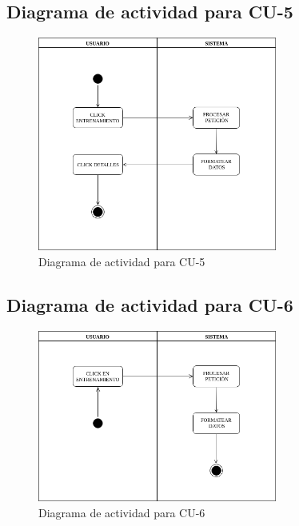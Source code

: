 \subsection{Diagrama de actividad para CU-5 }
\begin{figure}[H]
  \begin{center}
    \includegraphics[width=0.7\textwidth]{imagenes/DA-CU-5.png}
    \caption{Diagrama de actividad para CU-5}
    \label{fig:DA-CU-5}
  \end{center}
\end{figure}
\subsection{Diagrama de actividad para CU-6 }
\begin{figure}[H]
  \begin{center}
    \includegraphics[width=0.7\textwidth]{imagenes/DA-CU-6.png}
    \caption{Diagrama de actividad para CU-6}
    \label{fig:DA-CU-6}
  \end{center}
\end{figure}

